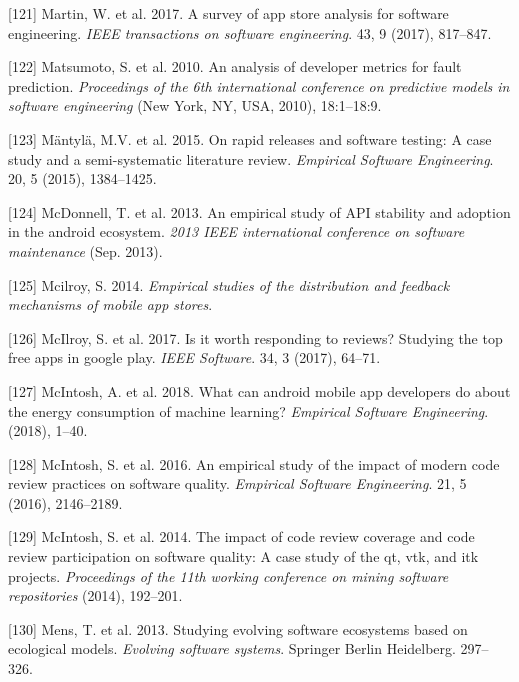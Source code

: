 \documentclass[]{book}
\begin{document}
\hypertarget{ref-martin2015survey}{}
{[}121{]} Martin, W. et al. 2017. A survey of app store analysis for
software engineering. \emph{IEEE transactions on software engineering}.
43, 9 (2017), 817--847.

\hypertarget{ref-Matsumoto2010}{}
{[}122{]} Matsumoto, S. et al. 2010. An analysis of developer metrics
for fault prediction. \emph{Proceedings of the 6th international
conference on predictive models in software engineering} (New York, NY,
USA, 2010), 18:1--18:9.

\hypertarget{ref-mantyla2015a}{}
{[}123{]} Mäntylä, M.V. et al. 2015. On rapid releases and software
testing: A case study and a semi-systematic literature review.
\emph{Empirical Software Engineering}. 20, 5 (2015), 1384--1425.

\hypertarget{ref-McDonnell2013}{}
{[}124{]} McDonnell, T. et al. 2013. An empirical study of API stability
and adoption in the android ecosystem. \emph{2013 IEEE international
conference on software maintenance} (Sep. 2013).

\hypertarget{ref-mcilroy2014empirical}{}
{[}125{]} Mcilroy, S. 2014. \emph{Empirical studies of the distribution
and feedback mechanisms of mobile app stores}.

\hypertarget{ref-mcilroy2017worth}{}
{[}126{]} McIlroy, S. et al. 2017. Is it worth responding to reviews?
Studying the top free apps in google play. \emph{IEEE Software}. 34, 3
(2017), 64--71.

\hypertarget{ref-MSA2018}{}
{[}127{]} McIntosh, A. et al. 2018. What can android mobile app
developers do about the energy consumption of machine learning?
\emph{Empirical Software Engineering}. (2018), 1--40.

\hypertarget{ref-mcintosh2016empirical}{}
{[}128{]} McIntosh, S. et al. 2016. An empirical study of the impact of
modern code review practices on software quality. \emph{Empirical
Software Engineering}. 21, 5 (2016), 2146--2189.

\hypertarget{ref-mcintosh2014impact}{}
{[}129{]} McIntosh, S. et al. 2014. The impact of code review coverage
and code review participation on software quality: A case study of the
qt, vtk, and itk projects. \emph{Proceedings of the 11th working
conference on mining software repositories} (2014), 192--201.

\hypertarget{ref-Mens2013}{}
{[}130{]} Mens, T. et al. 2013. Studying evolving software ecosystems
based on ecological models. \emph{Evolving software systems}. Springer
Berlin Heidelberg. 297--326.
\end{document}
